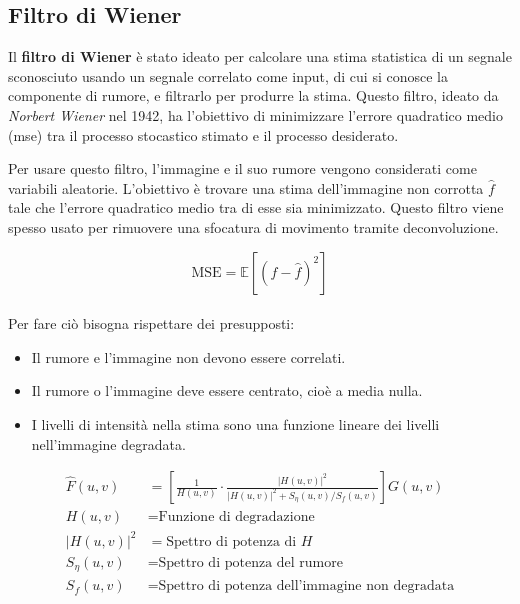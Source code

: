 \documentclass[../main.tex]{subfiles}
\begin{document}
	\subsection{Filtro di Wiener}
	
	Il \textbf{filtro di Wiener} è stato ideato per calcolare una stima statistica di un segnale sconosciuto usando un segnale correlato come input, di cui si conosce la componente di rumore, e filtrarlo per produrre la stima. Questo filtro, ideato da \textit{Norbert Wiener} nel 1942\cite{wiener_1942}, ha l'obiettivo di minimizzare l'errore quadratico medio (\acrshort{mse}) tra il processo stocastico stimato e il processo desiderato\cite{oppenheimer_2010}.
	
	Per usare questo filtro, l'immagine e il suo rumore vengono considerati come variabili aleatorie. L'obiettivo è trovare una stima dell'immagine non corrotta $\hat{f}$ tale che l'errore quadratico medio tra di esse sia minimizzato. Questo filtro viene spesso usato per rimuovere una sfocatura di movimento tramite deconvoluzione. 
	
	\begin{equation}
		\text{MSE} = \mathbb{E}\left[\left(f-\hat{f}\right)^2\right]
	\end{equation}
	\\[-10pt]
	Per fare ciò bisogna rispettare dei presupposti: \cite{bergamasco_2016}
	
	\begin{itemize}
		\itemsep0em
		\item Il rumore e l'immagine non devono essere correlati.
		\item Il rumore o l'immagine deve essere centrato, cioè a media nulla.
		\item I livelli di intensità nella stima sono una funzione lineare dei livelli nell'immagine degradata.
	\end{itemize}
	\begin{align}
		\hat{F}(u,v) &= \left[\frac{1}{H(u,v)}\cdot\frac{\left|H(u,v)\right|^2}{\left|H(u,v)\right|^2+S_\eta(u,v)/S_f(u,v)}\right]G(u,v)\\[5pt]
		H(u,v) &= \text{Funzione di degradazione} \nonumber \\
		\left|H(u,v)\right|^2 &= \text{Spettro di potenza di } H \nonumber \\
		S_\eta(u,v) &= \text{Spettro di potenza del rumore} \nonumber \\
		S_f(u,v) &= \text{Spettro di potenza dell'immagine non degradata} \nonumber 
	\end{align}
	
\end{document}
